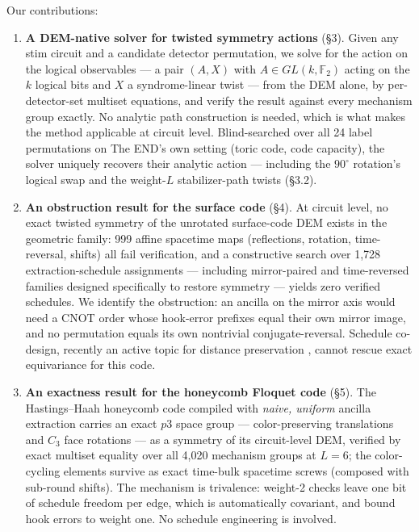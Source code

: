 \documentclass[11pt]{article}
\newcommand{\F}{\mathbb{F}}
\begin{document}
Our contributions:

\begin{enumerate}
\item \textbf{A DEM-native solver for twisted symmetry actions} (\S3).
Given any stim circuit and a candidate detector permutation, we solve for
the action on the logical observables --- a pair $(A, X)$ with
$A \in GL(k, \F_2)$ acting on the $k$ logical bits and $X$ a syndrome-linear
twist --- from the DEM alone, by per-detector-set multiset equations, and
verify the result against every mechanism group exactly. No analytic path
construction is needed, which is what makes the method applicable at circuit
level. Blind-searched over all 24 label permutations on The END's own
setting (toric code, code capacity), the solver uniquely recovers their
analytic action --- including the $90^\circ$ rotation's logical swap and the
weight-$L$ stabilizer-path twists (\S3.2).

\item \textbf{An obstruction result for the surface code} (\S4). At circuit
level, no exact twisted symmetry of the unrotated surface-code DEM exists in
the geometric family: 999 affine spacetime maps (reflections, rotation,
time-reversal, shifts) all fail verification, and a constructive search over
1{,}728 extraction-schedule assignments --- including mirror-paired and
time-reversed families designed specifically to restore symmetry --- yields
zero verified schedules. We identify the obstruction: an ancilla on the
mirror axis would need a CNOT order whose hook-error prefixes equal their
own mirror image, and no permutation equals its own nontrivial
conjugate-reversal. Schedule co-design, recently an active topic for
distance preservation \cite{Kishony26,Fujiu25}, cannot rescue exact
equivariance for this code.

\item \textbf{An exactness result for the honeycomb Floquet code} (\S5).
The Hastings--Haah honeycomb code \cite{HH21} compiled with \emph{naive,
uniform} ancilla extraction carries an exact $p3$ space group ---
color-preserving translations and $C_3$ face rotations --- as a symmetry of
its circuit-level DEM, verified by exact multiset equality over all 4{,}020
mechanism groups at $L = 6$; the color-cycling elements survive as exact
time-bulk spacetime screws (composed with sub-round shifts). The mechanism
is trivalence: weight-2 checks leave one bit of schedule freedom per edge,
which is automatically covariant, and bound hook errors to weight one. No
schedule engineering is involved.


\end{enumerate}
\end{document}
